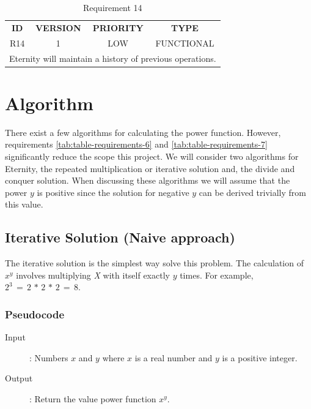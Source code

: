 \documentclass[11pt,a4paper]{report}
\theoremstyle{definition}
\theoremstyle{remark}
\begin{document}
        \begin{table}[t]
        \centering
            \begin{tabular}{cccc} %
                \textbf{ID} & \textbf{VERSION} & \textbf{PRIORITY} & \textbf{TYPE}\\
                        R14  &           1      &           LOW    &      FUNCTIONAL\\
                \hline
                \multicolumn{4}{l}{Eternity will maintain a history of previous operations.}
            \end{tabular}
            \caption{Requirement 14}
            \label{tab:table-requirements-14}
        \end{table}
        
    \chapter{Algorithm}
        There exist a few algorithms for calculating the power function. However, requirements \ref{tab:table-requirements-6} and \ref{tab:table-requirements-7} significantly reduce the scope this project.
        We will consider two algorithms for Eternity, the repeated multiplication or iterative solution and, the divide and conquer solution.
        When discussing these algorithms we will assume that the power $y$ is positive since the solution for negative $y$ can be derived trivially from this value.
         
        \section{Iterative Solution (Naive approach)} %
        	The iterative solution is the simplest way solve this problem. The calculation of $x^y$ involves multiplying \emph{X} with itself exactly $y$ times.
        	For example, $2^3 \, = \, 2 \, * \, 2 \, * \, 2 \, = \, 8$.
        	
        	\subsection{Pseudocode}
            	\begin{description}
                	\item [Input]: Numbers $x$ and $y$ where $x$ is a real number and $y$ is a positive integer.
                	\item [Output]: Return the value power function $x^y$.
            	\end{description}
            	
\end{document}
